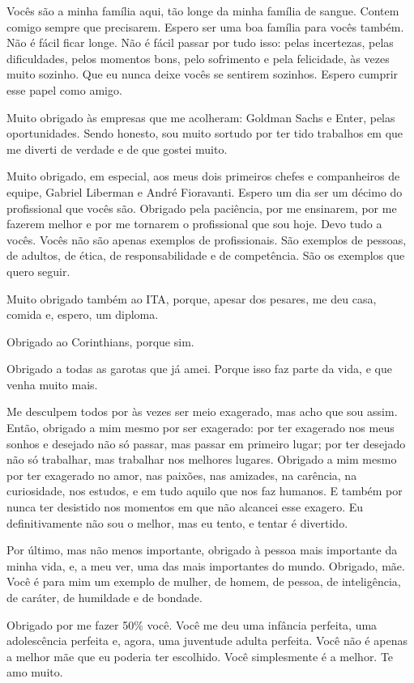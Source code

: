 \begin{otherlanguage}{brazilian}
Vocês são a minha família aqui, tão longe da minha família de sangue. Contem comigo sempre que precisarem. Espero ser uma boa família para vocês também. Não é fácil ficar longe. Não é fácil passar por tudo isso: pelas incertezas, pelas dificuldades, pelos momentos bons, pelo sofrimento e pela felicidade, às vezes muito sozinho. Que eu nunca deixe vocês se sentirem sozinhos. Espero cumprir esse papel como amigo.

Muito obrigado às empresas que me acolheram: Goldman Sachs e Enter, pelas oportunidades. Sendo honesto, sou muito sortudo por ter tido trabalhos em que me diverti de verdade e de que gostei muito.

Muito obrigado, em especial, aos meus dois primeiros chefes e companheiros de equipe, Gabriel Liberman e André Fioravanti. Espero um dia ser um décimo do profissional que vocês são. Obrigado pela paciência, por me ensinarem, por me fazerem melhor e por me tornarem o profissional que sou hoje. Devo tudo a vocês. Vocês não são apenas exemplos de profissionais. São exemplos de pessoas, de adultos, de ética, de responsabilidade e de competência. São os exemplos que quero seguir.

Muito obrigado também ao ITA, porque, apesar dos pesares, me deu casa, comida e, espero, um diploma.

Obrigado ao Corinthians, porque sim.

Obrigado a todas as garotas que já amei. Porque isso faz parte da vida, e que venha muito mais.

Me desculpem todos por às vezes ser meio exagerado, mas acho que sou assim. Então, obrigado a mim mesmo por ser exagerado: por ter exagerado nos meus sonhos e desejado não só passar, mas passar em primeiro lugar; por ter desejado não só trabalhar, mas trabalhar nos melhores lugares. Obrigado a mim mesmo por ter exagerado no amor, nas paixões, nas amizades, na carência, na curiosidade, nos estudos, e em tudo aquilo que nos faz humanos. E também por nunca ter desistido nos momentos em que não alcancei esse exagero. Eu definitivamente não sou o melhor, mas eu tento, e tentar é divertido.

Por último, mas não menos importante, obrigado à pessoa mais importante da minha vida, e, a meu ver, uma das mais importantes do mundo. Obrigado, mãe. Você é para mim um exemplo de mulher, de homem, de pessoa, de inteligência, de caráter, de humildade e de bondade.

Obrigado por me fazer 50\% você. Você me deu uma infância perfeita, uma adolescência perfeita e, agora, uma juventude adulta perfeita. Você não é apenas a melhor mãe que eu poderia ter escolhido. Você simplesmente é a melhor. Te amo muito.


\end{otherlanguage}
